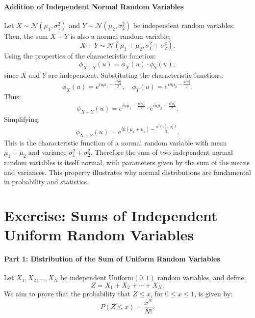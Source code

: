     \paragraph{Addition of Independent Normal Random Variables}
    Let \( X \sim \mathcal{N}(\mu_1, \sigma_1^2) \) and \( Y \sim \mathcal{N}(\mu_2, \sigma_2^2) \) be independent random variables. Then, the sum \( X + Y \) is also a normal random variable:
    \[
    X + Y \sim \mathcal{N}(\mu_1 + \mu_2, \sigma_1^2 + \sigma_2^2).
    \]
    Using the properties of the characteristic function:
    \[
    \phi_{X+Y}(u) = \phi_X(u) \cdot \phi_Y(u),
    \]
    since \( X \) and \( Y \) are independent. \newline
    Substituting the characteristic functions:
    \[
    \phi_X(u) = e^{iu\mu_1 - \frac{u^2\sigma_1^2}{2}}, \quad \phi_Y(u) = e^{iu\mu_2 - \frac{u^2\sigma_2^2}{2}}.
    \]
    Thus:
    \[
    \phi_{X+Y}(u) = e^{iu\mu_1 - \frac{u^2\sigma_1^2}{2}} \cdot e^{iu\mu_2 - \frac{u^2\sigma_2^2}{2}}.
    \]
    Simplifying:
    \[
    \phi_{X+Y}(u) = e^{iu(\mu_1 + \mu_2) - \frac{u^2(\sigma_1^2 + \sigma_2^2)}{2}}.
    \]
    This is the characteristic function of a normal random variable with mean \( \mu_1 + \mu_2 \) and variance \( \sigma_1^2 + \sigma_2^2 \). \newline
    Therefore the sum of two independent normal random variables is itself normal, with parameters given by the sum of the means and variances. This property illustrates why normal distributions are fundamental in probability and statistics.
    
        
\section{Exercise: Sums of Independent Uniform Random Variables}

\paragraph{Part 1: Distribution of the Sum of Uniform Random Variables}

Let \( X_1, X_2, \dots, X_N \) be independent \( \text{Uniform}(0, 1) \) random variables, and define:
\[
Z = X_1 + X_2 + \cdots + X_N.
\]
We aim to prove that the probability that \( Z \leq x \), for \( 0 \leq x \leq 1 \), is given by:
\[
P(Z \leq x) = \frac{x^N}{N!}.
\]

